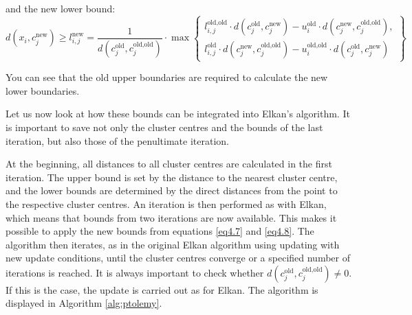 and the new lower bound:
\begin{equation}
	\label{eq4.8}
	d(x_i, c_j^{\text{new}}) \geq l_{i,j}^{\text{new}} = \frac{1}{d(c_j^{\text{old}}, c_j^{\text{old,old}})} \cdot \max \left\{
	\begin{array}{l}
		l_{i,j}^{\text{old,old}} \cdot d(c_j^{\text{old}}, c_j^{\text{new}}) - u_i^{\text{old}} \cdot d(c_j^{\text{new}}, c_j^{\text{old,old}}), \\
		l_{i,j}^{\text{old}} \cdot d(c_j^{\text{new}}, c_j^{\text{old,old}}) - u_i^{\text{old,old}} \cdot d(c_j^{\text{old}}, c_j^{\text{new}})
	\end{array}
	\right\}
\end{equation}

You can see that the old upper boundaries are required to calculate the new lower boundaries.

Let us now look at how these bounds can be integrated into Elkan's algorithm. It is important to save not only the cluster centres and the bounds of the last iteration, but also those of the penultimate iteration.

At the beginning, all distances to all cluster centres are calculated in the first iteration. The upper bound is set by the distance to the nearest cluster centre, and the lower bounds are determined by the direct distances from the point to the respective cluster centres. An iteration is then performed as with Elkan, which means that bounds from two iterations are now available. This makes it possible to apply the new bounds from equations \ref{eq4.7} and \ref{eq4.8}. The algorithm then iterates, as in the original Elkan algorithm using updating with new update conditions, until the cluster centres converge or a specified number of iterations is reached. It is always important to check whether $d(c_j^{\text{old}}, c_j^{\text{old,old}}) \neq 0$. If this is the case, the update is carried out as for Elkan. The algorithm is displayed in Algorithm \ref{alg:ptolemy}.






